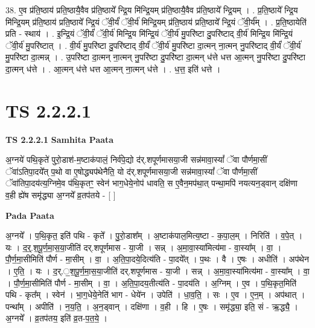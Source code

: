 \documentclass[17pt]{extarticle}
\begin{document}
38. ए॒व प्र॑ति॒ष्ठाय॑ प्रति॒ष्ठायै॒वैव प्र॑ति॒ष्ठाये᳚ न्द्रि॒य मि॑न्द्रि॒यम् प्र॑ति॒ष्ठायै॒वैव प्र॑ति॒ष्ठाये᳚ न्द्रि॒यम् । . प्र॒ति॒ष्ठाये᳚ न्द्रि॒य मि॑न्द्रि॒यम् प्र॑ति॒ष्ठाय॑ प्रति॒ष्ठाये᳚ न्द्रि॒यं ॅवी॒र्यं॑ ॅवी॒र्य॑ मिन्द्रि॒यम् प्र॑ति॒ष्ठाय॑ प्रति॒ष्ठाये᳚ न्द्रि॒यं ॅवी॒र्य᳚म् । . प्र॒ति॒ष्ठायेति॑ प्रति - स्थाय॑ । . इ॒न्द्रि॒यं ॅवी॒र्यं॑ ॅवी॒र्य॑ मिन्द्रि॒य मि॑न्द्रि॒यं ॅवी॒र्य॑ मु॒परि॑ष्टा दु॒परि॑ष्टाद् वी॒र्य॑ मिन्द्रि॒य मि॑न्द्रि॒यं ॅवी॒र्य॑ मु॒परि॑ष्टात् । . वी॒र्य॑ मु॒परि॑ष्टा दु॒परि॑ष्टाद् वी॒र्यं॑ ॅवी॒र्य॑ मु॒परि॑ष्टा दा॒त्मन् ना॒त्मन् नु॒परि॑ष्टाद् वी॒र्यं॑ ॅवी॒र्य॑ मु॒परि॑ष्टा दा॒त्मन्न् । . उ॒परि॑ष्टा दा॒त्मन् ना॒त्मन् नु॒परि॑ष्टा दु॒परि॑ष्टा दा॒त्मन् ध॑त्ते धत्त आ॒त्मन् नु॒परि॑ष्टा दु॒परि॑ष्टा दा॒त्मन् ध॑त्ते । . आ॒त्मन् ध॑त्ते धत्त आ॒त्मन् ना॒त्मन् ध॑त्ते । . ध॒त्त॒ इति॑ धत्ते । \newline
\pagebreak
{}

\section{ TS 2.2.2.1 }

\textbf{TS 2.2.2.1 } \newline
\textbf{Samhita Paata} \newline

अ॒ग्नये॑ पथि॒कृते॑ पुरो॒डाश॑-म॒ष्टाक॑पालं॒ निर्व॑पे॒द्यो द॑र्.शपूर्णमासया॒जी सन्न॑मावा॒स्यां᳚ ॅवा पौर्णमा॒सीं ॅवा॑ऽतिपा॒दये᳚त् प॒थो वा ए॒षोद्ध्यप॑थेनैति॒ यो द॑र्.शपूर्णमासया॒जी सन्न॑मावा॒स्यां᳚ ॅवा पौर्णमा॒सीं ॅवा॑तिपा॒दय॑त्य॒ग्निमे॒व प॑थि॒कृतꣳ॒॒ स्वेन॑ भाग॒धेये॒नोप॑ धावति॒ स ए॒वैन॒मप॑था॒त् पन्था॒मपि॑ नयत्यन॒ड्वान् दक्षि॑णा व॒ही ह्ये॑ष समृ॑द्ध्या अ॒ग्नये᳚ व्र॒तप॑तये - [  ] \newline

\textbf{Pada Paata} \newline

अ॒ग्नये᳚ । प॒थि॒कृत॒ इति॑ पथि - कृते᳚ । पु॒रो॒डाश᳚म् । अ॒ष्टाक॑पाल॒मित्य॒ष्टा - क॒पा॒ल॒म् । निरिति॑ । व॒पे॒त् । यः । द॒र्॒.श॒पू॒र्ण॒मा॒स॒या॒जीति॑ दर्.शपूर्णमास - या॒जी । सन्न् । अ॒मा॒वा॒स्या॑मित्य॑मा - वा॒स्या᳚म् । वा॒ । पौ॒र्ण॒मा॒सीमिति॑ पौर्ण - मा॒सीम् । वा॒ । अ॒ति॒पा॒दये॒दित्य॑ति - पा॒दये᳚त् । प॒थः । वै । ए॒षः । अधीति॑ । अप॑थेन । ए॒ति॒ । यः । द॒र्.॒श॒पू॒र्ण॒मा॒स॒या॒जीति॑ दर्.शपूर्णमास - या॒जी । सन्न् । अ॒मा॒वा॒स्या॑मित्य॑मा - वा॒स्या᳚म् । वा॒ । पौ॒र्ण॒मा॒सीमिति॑ पौर्ण - मा॒सीम् । वा॒ । अ॒ति॒पा॒दय॒तीत्य॑ति - पा॒दय॑ति । अ॒ग्निम् । ए॒व । प॒थि॒कृत॒मिति॑ पथि - कृत᳚म् । स्वेन॑ । भा॒ग॒धेये॒नेति॑ भाग - धेये॑न । उपेति॑ । धा॒व॒ति॒ । सः । ए॒व । ए॒न॒म् । अप॑थात् । पन्था᳚म् । अपीति॑ । न॒य॒ति॒ । अ॒न॒ड्वान् । दक्षि॑णा । व॒ही । हि । ए॒षः । समृ॑द्ध्या॒ इति॒ सं - ऋ॒द्ध्यै॒ । अ॒ग्नये᳚ । व्र॒तप॑तय॒ इति॑ व्र॒त-प॒त॒ये॒ ।  \newline
\end{document}
